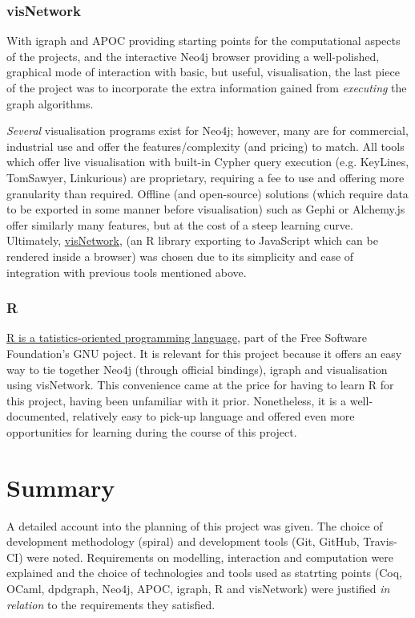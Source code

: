 \subsubsection{visNetwork}

With igraph and APOC providing starting points for the computational aspects of
the projects, and the interactive Neo4j browser providing a well-polished,
graphical mode of interaction with basic, but useful, visualisation, the last
piece of the project was to incorporate the extra information gained from
\emph{executing} the graph algorithms.

\emph{Several} visualisation programs exist for Neo4j; however, many are for
commercial, industrial use and offer the features/complexity (and pricing) to
match. All tools which offer live visualisation with built-in Cypher query
execution (e.g. KeyLines, TomSawyer, Linkurious) are proprietary, requiring a
fee to use and offering more granularity than required. Offline (and
open-source) solutions (which require data to be exported in some manner before
visualisation) such as Gephi or Alchemy.js offer similarly many features, but at
the cost of a steep learning curve.  Ultimately,
\href{http://datastorm-open.github.io/visNetwork}{visNetwork}, (an R library
exporting to JavaScript which can be rendered inside a browser) was chosen due
to its simplicity and ease of integration with previous tools mentioned above.

\subsubsection{R}

\href{http://www.r-project.org}{R is a tatistics-oriented programming language},
part of the Free Software Foundation's GNU poject. It is relevant for this
project because it offers an easy way to tie together Neo4j (through official
bindings), igraph and visualisation using visNetwork. This convenience came at
the price for having to learn R for this project, having been unfamiliar with it
prior. Nonetheless, it is a well-documented, relatively easy to pick-up language
and offered even more opportunities for learning during the course of this
project.

\section{Summary}

A detailed account into the planning of this project was given. The choice of
development methodology (spiral) and development tools (Git, GitHub, Travis-CI)
were noted. Requirements on modelling, interaction and computation were
explained and the choice of technologies and tools used as statrting points
(Coq, OCaml, dpdgraph, Neo4j, APOC, igraph, R and visNetwork) were justified
\emph{in relation} to the requirements they satisfied.
